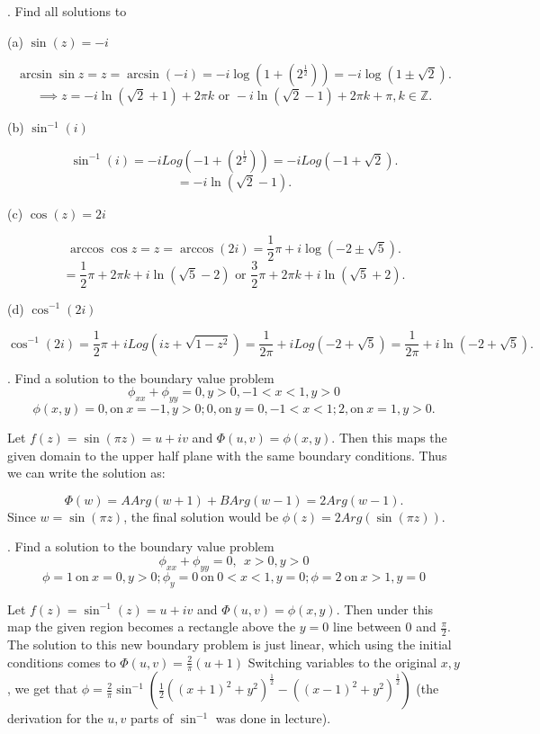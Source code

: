 \documentclass[letterpaper, reqno,11pt]{article}
\begin{document}
\medskip


. Find all solutions to

(a)  $ \sin (z)= -i$

\[
\arcsin \sin z=z=\arcsin(-i)=-i\log\left( 1+\left( 2^{\frac{1}{2}} \right)  \right) =-i\log\left( 1\pm \sqrt{2}   \right)
.\]
\[
\implies z=-i\ln(\sqrt{2} +1)+2\pi k\text{ or }-i\ln(\sqrt{2} -1)+2\pi k+\pi, k\in\mathbb{Z}
.\]

(b) $ \sin^{-1} (i)$

\[
\sin ^{-1}(i)=-iLog\left( -1+\left( 2^{\frac{1}{2}} \right)  \right) =-iLog\left( -1+ \sqrt{2}   \right)
.\]
\[
    =-i\ln\left( \sqrt{2} -1 \right) 
.\]

(c) $ \cos (z) = 2i $

\[
\arccos\cos z=z=\arccos(2i)=\frac{1}{2}\pi+i\log\left(-2\pm\sqrt{5} \right)
.\]
\[
=\frac{1}{2}\pi+2\pi k+i\ln(\sqrt{5} -2)\text{ or }\frac{3}{2}\pi+2\pi k+i\ln\left( \sqrt{5} +2 \right) 
.\]

(d) $ \cos^{-1} (2i)$

\[
\cos^{-1}(2i)=\frac{1}{2}\pi+iLog\left( iz+\sqrt{1-z^2}  \right) =\frac{1}{2\pi}+iLog\left( -2+\sqrt{5}  \right)=\frac{1}{2\pi}+i\ln\left( -2+\sqrt{5}  \right)
.\]

\medskip


. Find a solution to the boundary value problem 
$$ \phi_{xx}+ \phi_{yy}=0, y>0, -1 <x<1, y>0$$
$$ \phi(x, y)= 0, \mbox{on} \ x=-1, y>0 ; 0, \mbox{on}\  y=0,-1<x<1;  2, \mbox{on}\  x=1, y>0.
$$

Let $f(z)=\sin(\pi z)=u+iv$ and $\Phi(u, v)=\phi(x, y)$. Then this maps the given domain to the upper half plane with the same boundary conditions. Thus we can write the solution as: 

\[
\Phi(w)=A Arg(w+1)+B Arg(w-1)=2 Arg(w-1)
.\]
Since $w=\sin(\pi z)$, the final solution would be $\phi(z)=2 Arg(\sin(\pi z))$. 


\medskip

. Find a solution to the boundary value problem
$$ \phi_{xx}+\phi_{yy}=0,  \ \  x>0, y>0 $$
$$ \phi= 1 \ \mbox{on} \ x=0, y>0; \phi_y=0   \ \mbox{on} \  0<x<1, y=0; \phi=2 \ \mbox{on} \ x>1, y=0 $$

Let $f(z)=\sin ^{-1}(z)=u+iv$ and $\Phi(u, v)=\phi(x, y)$. Then under this map the given region becomes a rectangle above the $y=0$ line between $0$ and $\frac{\pi}{2}$. The solution to this new boundary problem is just linear, which using the initial conditions comes to $\Phi(u, v)=\frac{2}{\pi}\left( u+1 \right) $ Switching variables to the original $x, y$, we get that $\phi=\frac{2}{\pi}\sin ^{-1}\left( \frac{1}{2}\left( \left( x+1 \right) ^2+y^2 \right) ^{\frac{1}{2}}-\left( \left( x-1 \right) ^2+y^2 \right) ^{\frac{1}{2}} \right) $ (the derivation for the $u, v$ parts of $\sin ^{-1}$ was done in lecture). 
\end{document}
